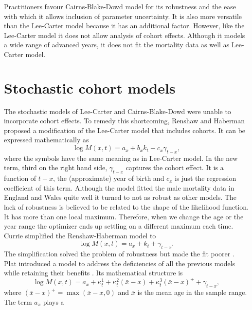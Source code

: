 \documentclass{article}
\numberwithin{equation}{section}
\begin{document}
Practitioners favour Cairns-Blake-Dowd model for its robustness and the ease
with which it allows inclusion of parameter uncertainty. It is also more 
versatile than the Lee-Carter model because it has an additional factor. 
However, like the Lee-Carter model it does not allow analysis of cohort effects.
Although it models a wide range of advanced years, it does not fit the 
mortality data as well as Lee-Carter model.

\section{Stochastic cohort models}\label{s9}
The stochastic models of Lee-Carter and Cairns-Blake-Dowd were unable to
incorporate cohort effects. To remedy this shortcoming, Renshaw and Haberman
\cite{renshaw2006cohort} proposed a modification of the Lee-Carter model that 
includes cohorts. It can be expressed mathematically as
\begin{equation}\label{s9e1}
\log{M}(x, t) = {a}_x + {b}_x{k}_t + {c}_x\gamma_{t-x},
\end{equation}
where the symbols have the same meaning as in Lee-Carter model. In the new
term, third on the right hand side, $\gamma_{t-x}$ captures the cohort effect.
It is a function of $t - x$, the (approximate) year of birth and ${c}_x$
is just the regression coefficient of this term. Although the model fitted the
male mortality data in England and Wales quite well it turned to not as 
robust as other models. The lack of robustness is believed to be related to
the shape of the likelihood function. It has more than one local maximum.
Therefore, when we change the age or the year range the optimizer ends up
settling on a different maximum each time\cite{cairns2008modelling}. Currie
simplified the Renshaw-Haberman model to
\begin{equation}\label{s9e2}
\log{M}(x, t) = {a}_x + {k}_t + \gamma_{t-x}.
\end{equation}
The simplification solved the problem of robustness but made the fit poorer
\cite{plat2009stochastic}. Plat introduced a model to address the deficiencies
of all the previous models while retaining their benefits 
\cite{plat2009stochastic}. Its mathematical structure is
\begin{equation}\label{s9e3}
\log M(x,t) = a_x + \kappa^1_t + \kappa^2_t(\bar{x} - x) + 
\kappa^3_t(\bar{x} - x)^+ + \gamma_{t-x},
\end{equation}
where $(\bar{x} - x)^+ = \max(\bar{x} - x, 0)$ and $\bar{x}$ is the mean age
in the sample range. The term $a_x$ plays a 
\end{document}
